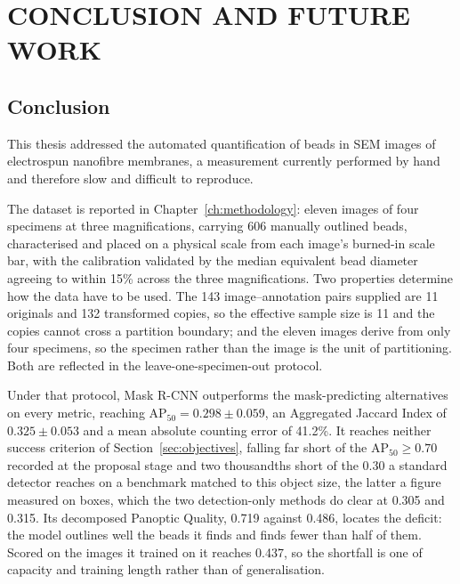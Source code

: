 \chapter{CONCLUSION AND FUTURE WORK}
\label{ch:conclusion}

\section{Conclusion}

This thesis addressed the automated quantification of beads in SEM
images of electrospun nanofibre membranes, a measurement currently performed by
hand and therefore slow and difficult to reproduce.

The dataset is reported in Chapter~\ref{ch:methodology}: eleven images of
four specimens at three magnifications, carrying 606 manually outlined beads,
characterised and placed on a physical scale from each image's burned-in
scale bar, with the calibration validated by the median equivalent bead diameter
agreeing to within 15\% across the three magnifications. Two properties determine
how the data have to be used. The 143 image--annotation pairs supplied are 11
originals and 132 transformed copies, so the effective sample size is 11 and the
copies cannot cross a partition boundary; and the eleven images derive from
only four specimens, so the specimen rather than the image is the unit of
partitioning. Both are reflected in the leave-one-specimen-out protocol.

Under that protocol, Mask R-CNN outperforms the mask-predicting alternatives on
every metric, reaching $\mathrm{AP}_{50} = 0.298 \pm 0.059$, an Aggregated Jaccard
Index of $0.325 \pm 0.053$ and a mean absolute counting error of 41.2\%. It
reaches neither success criterion of Section~\ref{sec:objectives}, falling far
short of the $\mathrm{AP}_{50} \geq 0.70$ recorded at the proposal stage and two
thousandths short of the 0.30 a standard detector reaches on a benchmark matched
to this object size, the latter a figure measured on boxes, which the two
detection-only methods do clear at 0.305 and 0.315. Its decomposed Panoptic
Quality, 0.719 against 0.486, locates the deficit: the model outlines well the
beads it finds and finds fewer than half of them. Scored on the images it
trained on it reaches 0.437, so the shortfall is one of capacity and training
length rather than of generalisation.

